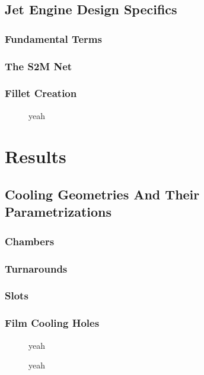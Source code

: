 \documentclass[a4paper, 11pt]{report}
\theoremstyle{definition}
\begin{document}
\section{Jet Engine Design Specifics}
\subsection{Fundamental Terms}
\subsection{The S2M Net}
\subsection{Fillet Creation}
\begin{figure}[!ht]
	\centering
	
	\caption{yeah}
\end{figure}

\chapter{Results}
\section{Cooling Geometries And Their Parametrizations}
\subsection{Chambers}
\subsection{Turnarounds}
\subsection{Slots}
\subsection{Film Cooling Holes}
\begin{figure}[!ht]
	\centering
	
	\caption{yeah}
\end{figure}
\begin{figure}[!ht]
	\centering
	
	\caption{yeah}
\end{figure}
\end{document}
